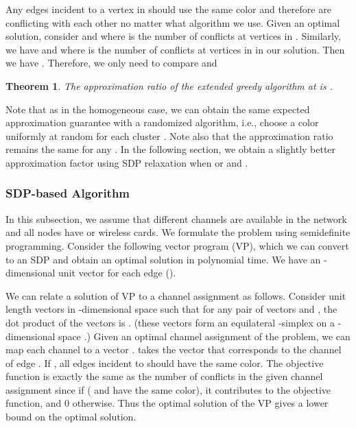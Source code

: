 \documentclass[titlepage, 11pt]{article}
\newtheorem{theorem}{Theorem}
\begin{document}
Any edges   incident to a vertex in 
should use the same color and therefore are conflicting with each other no matter what algorithm we use.
Given an optimal solution, consider  and 
where  is the number of conflicts at vertices in .
Similarly, we have  and  where
 is the number of conflicts at vertices in  in our solution.
Then we have . Therefore, we only need to
compare  and 

\begin{theorem}
\iffalse
The number of conflicts created by the extended greedy algorithm 
at  is at most 
where  is . 
\fi
The approximation ratio of the extended greedy algorithm 
at  is  .
\label{th:1k-approx}
\end{theorem}

Note that as in the homogeneous case, 
we can obtain the same expected approximation guarantee with a randomized algorithm, 
i.e., choose a color uniformly at random for each cluster .
Note also that the approximation ratio remains the same for any .
In the following section, we obtain a slightly better approximation factor 
using SDP relaxation  when  or  and .

\subsubsection{SDP-based Algorithm}
\label{sec:sdp}

In this subsection, we assume that  different channels are
available in the network and all nodes have  or  wireless cards.  We formulate the problem using semidefinite programming.
Consider the following vector program (VP), which we can  
convert to an SDP and obtain an optimal solution in polynomial time. 
We have an -dimensional unit vector  for each edge  ().


We can relate a solution of VP to a channel assignment as follows.
Consider  unit length vectors in -dimensional space such 
that for any pair of vectors  and , 
the dot product of the vectors is .
(these  vectors form an equilateral -simplex on a -dimensional space
\cite{kcut,kms94}.)
Given an optimal channel assignment of the problem,
we can map each channel to a vector .
 takes the vector that corresponds to the channel of edge .
If , all edges incident to  should have the same color.
The objective function is exactly the same as the number of 
conflicts in the given channel assignment
since if  ( and  have the same color),
it contributes  to the objective function, and 0 otherwise.
Thus the optimal solution of the VP gives a lower bound on the optimal solution.
\end{document}
